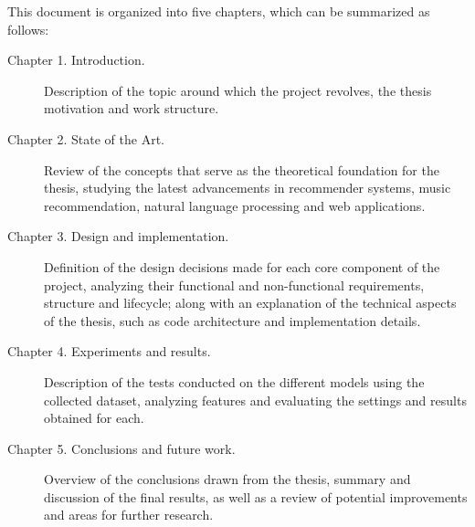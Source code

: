 This document is organized into five chapters, which can be summarized as follows:

\begin{description}
    \item[Chapter 1. Introduction.] Description of the topic around which the project revolves, the thesis motivation and work structure.
    \item[Chapter 2. State of the Art.] Review of the concepts that serve as the theoretical foundation for the thesis, studying the latest advancements in recommender systems, music recommendation, natural language processing and web applications.
    \item[Chapter 3. Design and implementation.] Definition of the design decisions made for each core component of the project, analyzing their functional and non-functional requirements, structure and lifecycle; along with an explanation of the technical aspects of the thesis, such as code architecture and implementation details.
    \item[Chapter 4. Experiments and results.] Description of the tests conducted on the different models using the collected dataset, analyzing features and evaluating the settings and results obtained for each.
    \item[Chapter 5. Conclusions and future work.] Overview of the conclusions drawn from the thesis, summary and discussion of the final results, as well as a review of potential improvements and areas for further research.
\end{description}